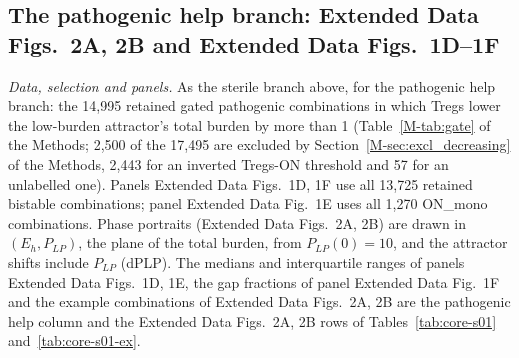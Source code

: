 \documentclass[11pt]{article}
\begin{document}
\begin{table}[H]
\centering
\caption{The example combinations of the phase-portrait panels: key, thresholds, and the stored
attractors ($E_h$, $M_1$, $P_{LP}$; total burden $b$).}
\label{tab:core-s01-ex}
\scriptsize\setlength{\tabcolsep}{2.5pt}
\end{table}

\subsection{The pathogenic help branch: Extended Data Figs.~2A, 2B and Extended Data Figs.~1D--1F}

\emph{Data, selection and panels.} As the sterile branch above, for the pathogenic help
branch: the 14{,}995 retained gated pathogenic
combinations in which Tregs lower the low-burden attractor's total burden by more than 1
(Table~\ref{M-tab:gate} of the Methods; 2{,}500 of the 17{,}495 are excluded by
Section~\ref{M-sec:excl_decreasing} of the Methods, 2{,}443 for an inverted Tregs-ON
threshold and 57 for an unlabelled one). Panels Extended Data Figs.~1D, 1F use all
13{,}725 retained bistable combinations; panel Extended Data Fig.~1E uses all 1{,}270
ON\_mono combinations. Phase portraits (Extended Data Figs.~2A, 2B) are drawn in $(E_h, P_{LP})$, the plane of the total burden,
from $P_{LP}(0) = 10$, and the attractor shifts include $P_{LP}$ (dPLP). The medians and
interquartile ranges of panels Extended Data Figs.~1D, 1E, the gap fractions of panel Extended Data Fig.~1F and the example
combinations of Extended Data Figs.~2A, 2B are the pathogenic help column and the Extended Data Figs.~2A, 2B rows of
Tables~\ref{tab:core-s01} and~\ref{tab:core-s01-ex}.
\end{document}
